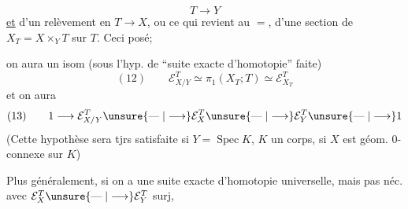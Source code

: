 
\[
T\longrightarrow Y
\]
\uline{et} d'un relèvement en $T\longrightarrow X$, ou ce qui revient au $=$, d'une section de $X_T=X\times_YT$ sur $T$. Ceci posé;


on aura un isom  (sous l'hyp. de ``suite exacte d'homotopie'' faite)
\[
(12)\qquad \mathcal E_{X/Y}^T\simeq\pi_1(X_T;T)\simeq\mathcal E_{X_T}^T
\]
et on aura
\[
(13)\qquad 1\longrightarrow\mathcal E_{X/Y}^T\unsure{\mathrel{\text{---}}|\longrightarrow}\mathcal E_X^T\unsure{\mathrel{\text{---}}|\longrightarrow}\mathcal E_Y^T\unsure{\mathrel{\text{---}}|\longrightarrow}1
\]
(Cette hypothèse sera tjrs satisfaite si $Y=\operatorname{Spec}K$, $K$ un corps, si $X$ est géom. $0$-connexe sur $K$)

Plus généralement, si on a une suite exacte d'homotopie universelle, mais pas néc. avec $\mathcal E_X^T\unsure{\mathrel{\text{---}}|\longrightarrow}\mathcal E_Y^T$ surj,

